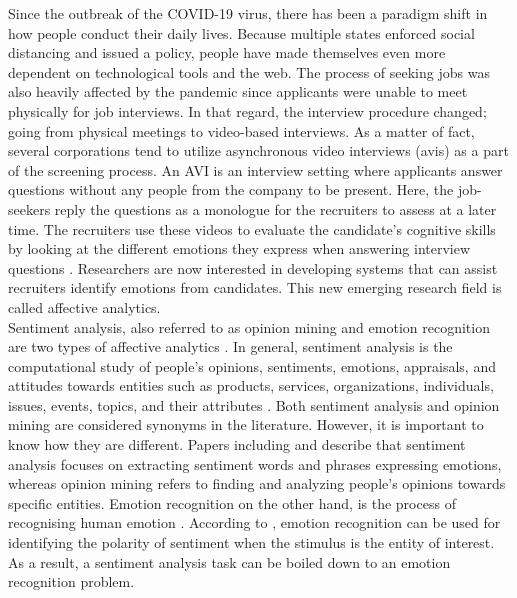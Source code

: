 Since the outbreak of the COVID-19 virus, there has been a paradigm shift in how people conduct their daily lives. Because multiple states enforced social distancing and issued a  policy, people have made themselves even more dependent on technological tools and the web. The process of seeking jobs was also heavily affected by the pandemic since applicants were unable to meet physically for job interviews. In that regard, the interview procedure changed; going from physical meetings to video-based interviews. As a matter of fact, several corporations tend to utilize asynchronous video interviews (\acrshort{avi}s) as a part of the screening process. An AVI is an interview setting where applicants answer questions without any people from the company to be present. Here, the job-seekers reply the questions as a monologue for the recruiters to assess at a later time. The recruiters use these videos to evaluate the candidate's cognitive skills by looking at the different emotions they express when answering interview questions \cite{JOSHI20201316}. Researchers are now interested in developing systems that can assist recruiters identify emotions from candidates. This new emerging research field is called affective analytics. \\ 

Sentiment analysis, also referred to as opinion mining and emotion recognition are two types of affective analytics \cite{MSA_review2_GANDHI2023424}. In general, sentiment analysis is the computational study of people’s opinions, sentiments, emotions, appraisals, and attitudes towards entities such as products, services, organizations, individuals, issues, events, topics, and their attributes \cite{SA-definition} \cite{HP-integration-project}. Both sentiment analysis and opinion mining are considered synonyms in the literature. However, it is important to know how they are different. Papers including \cite{SA-history-MANTYLA201816} and \cite{Student-feedback-MOOCS-app11093986} describe that sentiment analysis focuses on extracting sentiment words and phrases expressing emotions, whereas opinion mining refers to finding and analyzing people's opinions towards specific entities. Emotion recognition on the other hand, is the process of recognising human emotion \cite{MSA_review2_GANDHI2023424}. According to \cite{sentiment_emotion_difference_munezero2014they}, emotion recognition can be used for identifying the polarity of sentiment when the stimulus is the entity of interest. As a result, a sentiment analysis task can be boiled down to an emotion recognition problem.\\ 

